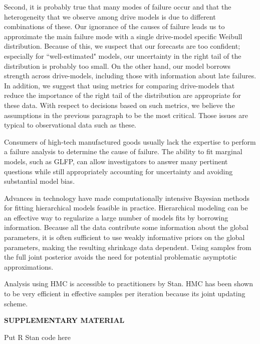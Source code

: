 \documentclass[12pt]{article}
\begin{document}
Second, it is probably true that many modes of failure occur and that the heterogeneity that we observe among drive models is due to different combinations of these. Our ignorance of the causes of failure leads us to approximate the main failure mode with a single drive-model specific Weibull distribution. Because of this, we suspect that our forecasts are too confident; especially for ``well-estimated" models, our uncertainty in the right tail of the distribution is probably too small. On the other hand, our model borrows strength across drive-models, including those with information about late failures. In addition, we suggest that using metrics for comparing drive-models that reduce the importance of the right tail of the distribution are appropriate for these data. With respect to decisions based on such metrics, we believe the assumptions in the previous paragraph to be the most critical. Those issues are typical to observational data such as these.

Consumers of high-tech manufactured goods usually lack the expertise to perform a failure analysis to determine the cause of failure. The ability to fit marginal models, such as GLFP, can allow investigators to answer many pertinent questions while still appropriately accounting for uncertainty and avoiding substantial model bias.

Advances in technology have made computationally intensive Bayesian methods for fitting hierarchical models feasible in practice. Hierarchical modeling can be an effective way to regularize a large number of models fits by borrowing information. Because all the data contribute some information about the global parameters, it is often sufficient to use weakly informative priors on the global parameters, making the resulting shrinkage data dependent. Using samples from the full joint posterior avoids the need for potential problematic asymptotic approximations.

Analysis using HMC is accessible to practitioners by Stan. HMC has been shown to be very efficient in effective samples per iteration because its joint updating scheme.


\pagebreak

\begin{center}
{\large\bf SUPPLEMENTARY MATERIAL}
\end{center}

\begin{description}

\item Put R Stan code here

\end{description}
\end{document}
